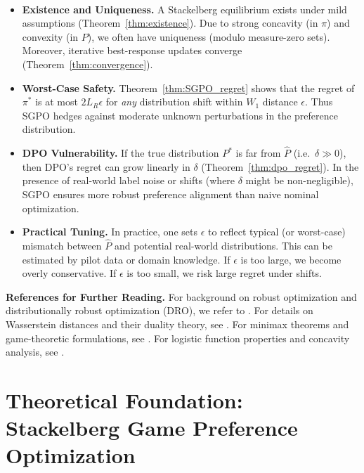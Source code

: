 \begin{remark}
\ 
\begin{itemize}
\item \textbf{Existence and Uniqueness.}  A Stackelberg equilibrium exists under mild assumptions (Theorem~\ref{thm:existence}).  Due to strong concavity (in $\pi$) and convexity (in $P$), we often have uniqueness (modulo measure-zero sets).  Moreover, iterative best-response updates converge (Theorem~\ref{thm:convergence}).

\item \textbf{Worst-Case Safety.}  Theorem~\ref{thm:SGPO_regret} shows that the regret of $\pi^*$ is at most $2L_R\epsilon$ for \emph{any} distribution shift within $W_1$ distance $\epsilon$.  Thus SGPO hedges against moderate unknown perturbations in the preference distribution.  

\item \textbf{DPO Vulnerability.}  If the true distribution $P^*$ is far from $\hat{P}$ (i.e.\ $\delta\gg 0$), then DPO’s regret can grow linearly in $\delta$ (Theorem~\ref{thm:dpo_regret}).  In the presence of real-world label noise or shifts (where $\delta$ might be non-negligible), SGPO ensures more robust preference alignment than naive nominal optimization.

\item \textbf{Practical Tuning.}  In practice, one sets $\epsilon$ to reflect typical (or worst-case) mismatch between $\hat{P}$ and potential real-world distributions.  This can be estimated by pilot data or domain knowledge.  If $\epsilon$ is too large, we become overly conservative.  If $\epsilon$ is too small, we risk large regret under shifts.
\end{itemize}
\end{remark}

\vspace{6pt}
\noindent
\textbf{References for Further Reading.} 
For background on robust optimization and distributionally robust optimization (DRO), we refer to \cite{ben2009robust, rahimian2019distributionally, gao2022distributionally}.  For details on Wasserstein distances and their duality theory, see \cite{villani2003topics, peyre2019computational}.  For minimax theorems and game-theoretic formulations, see \cite{sion1958general, basar1999dynamic}.  For logistic function properties and concavity analysis, see \cite{boyd2004convex}.



\section{Theoretical Foundation: Stackelberg Game Preference Optimization}

